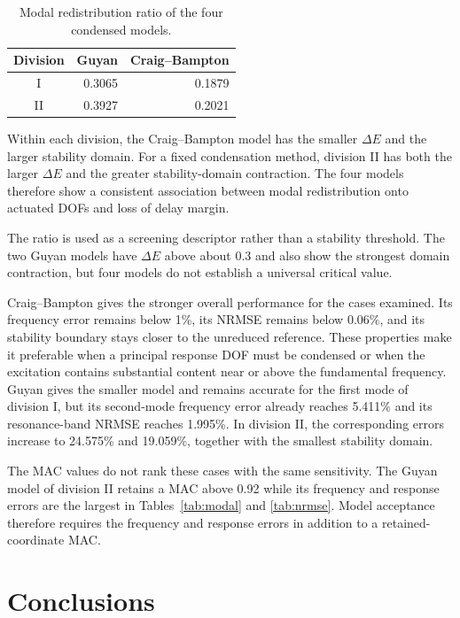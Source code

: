 \documentclass[11pt]{article}
\newenvironment{revision}{\begingroup\color{red}}{\endgroup}
\begin{document}
\begin{table}[H]
\centering
\caption{Modal redistribution ratio of the four condensed models.}
\label{tab:redistribution}
\begin{tabular}{crr}
\toprule
Division & Guyan & Craig--Bampton\\
\midrule
I & 0.3065 & 0.1879\\
II & 0.3927 & 0.2021\\
\bottomrule
\end{tabular}
\end{table}

\begin{revision}
Within each division, the Craig--Bampton model has the smaller \(\Delta E\) and the larger stability domain. For a fixed condensation method, division II has both the larger \(\Delta E\) and the greater stability-domain contraction. The four models therefore show a consistent association between modal redistribution onto actuated DOFs and loss of delay margin.

The ratio is used as a screening descriptor rather than a stability threshold. The two Guyan models have \(\Delta E\) above about 0.3 and also show the strongest domain contraction, but four models do not establish a universal critical value.

Craig--Bampton gives the stronger overall performance for the cases examined. Its frequency error remains below 1\%, its NRMSE remains below 0.06\%, and its stability boundary stays closer to the unreduced reference. These properties make it preferable when a principal response DOF must be condensed or when the excitation contains substantial content near or above the fundamental frequency. Guyan gives the smaller model and remains accurate for the first mode of division I, but its second-mode frequency error already reaches 5.411\% and its resonance-band NRMSE reaches 1.995\%. In division II, the corresponding errors increase to 24.575\% and 19.059\%, together with the smallest stability domain.

The MAC values do not rank these cases with the same sensitivity. The Guyan model of division II retains a MAC above 0.92 while its frequency and response errors are the largest in Tables~\ref{tab:modal} and \ref{tab:nrmse}. Model acceptance therefore requires the frequency and response errors in addition to a retained-coordinate MAC.
\end{revision}

\section{Conclusions}
\end{document}
